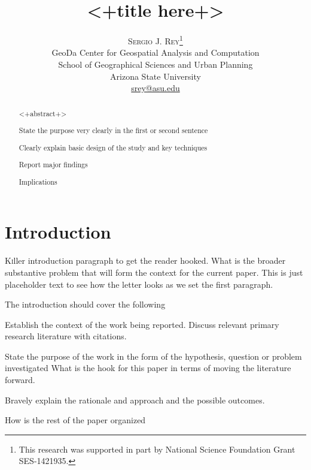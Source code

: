 \documentclass{article}
\title{\vspace{-15mm}\fontsize{24pt}{10pt}\selectfont\textbf{<+title here+>}} %
\author{
\large
\textsc{Sergio J. Rey}\thanks{This research was supported in part by National
Science Foundation Grant SES-1421935.}\\[2mm] %
\normalsize GeoDa Center for Geospatial Analysis and Computation\\%
\normalsize School of Geographical Sciences and Urban Planning\\%
\normalsize Arizona State University \\ %
\normalsize \href{mailto:srey@asu.edu}{srey@asu.edu} %
\vspace{-5mm}
}
\date{}
\begin{document}
\maketitle %

\thispagestyle{fancy} %


\begin{abstract}

\noindent 
<+abstract+>
\begin{compactitem}
\item State the purpose very clearly in the first or second sentence
\item Clearly explain basic design of the study and key techniques
\item Report major findings
\item Implications
\end{compactitem}




\end{abstract}




\section{Introduction}

\lettrine[nindent=0em,lines=3]{K} iller introduction paragraph to get the
reader hooked. What is the broader substantive problem that will form the
context for the current paper. This is just placeholder text to see how the
letter looks as we set the first paragraph.

The introduction should cover the following
\begin{compactitem}
\item Establish the context of the work being reported. Discuss relevant
  primary research literature with citations.
\item State the purpose of the work in the form of the hypothesis, question
  or problem investigated
  What is the hook for this paper in terms of moving the literature forward.
\item Bravely explain the rationale and approach and the possible outcomes.
\item How is the rest of the paper organized
\end{compactitem}
\end{document}
